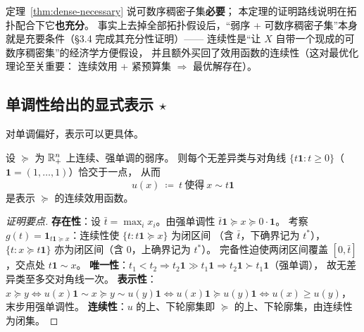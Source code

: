 \begin{remark}[与必要条件定理的关系]
定理~\ref{thm:dense-necessary} 说可数序稠密子集\textbf{必要}；
本定理的证明路线说明在拓扑配合下它\textbf{也充分}。
事实上去掉全部拓扑假设后，“弱序 + 可数序稠密子集”本身就是充要条件（§3.4 完成其充分性证明）——
连续性是“让 $X$ 自带一个现成的可数序稠密集”的经济学方便假设，
并且额外买回了效用函数的连续性（这对最优化理论至关重要：
连续效用 + 紧预算集 $\Rightarrow$ 最优解存在）。
\end{remark}

\subsection{单调性给出的显式表示 \texorpdfstring{$\star$}{*}}

对单调偏好，表示可以更具体。

\begin{proposition}[单调连续偏好的对角线构造]\label{prop:diagonal}
设 $\succeq$ 为 $\mathbb{R}^n_+$ 上连续、强单调的弱序。
则每个无差异类与对角线 $\{t\mathbf{1}:t\ge0\}$（$\mathbf{1}=(1,\dots,1)$）恰交于一点，
从而
\[
u(x)\ \coloneqq\ t\ \text{使得}\ x\sim t\mathbf{1}
\]
是表示 $\succeq$ 的连续效用函数。
\end{proposition}

\begin{proof}[证明要点]
\textbf{存在性}：设 $\bar t=\max_i x_i$。由强单调性 $\bar t\mathbf{1}\succeq x\succeq 0\cdot\mathbf{1}$。
考察 $g(t)=\mathbf{1}_{t\mathbf{1}\succeq x}$：连续性使 $\{t:t\mathbf{1}\succeq x\}$ 为闭区间
（含 $\bar t$，下确界记为 $t^*$），$\{t:x\succeq t\mathbf{1}\}$ 亦为闭区间（含 $0$，上确界记为 $t^{*}$）。
完备性迫使两闭区间覆盖 $[0,\bar t]$，交点处 $t\mathbf{1}\sim x$。
\textbf{唯一性}：$t_1<t_2\Rightarrow t_2\mathbf{1}\gg t_1\mathbf{1}\Rightarrow t_2\mathbf{1}\succ t_1\mathbf{1}$（强单调），
故无差异类至多交对角线一次。
\textbf{表示性}：$x\succeq y\iff u(x)\mathbf{1}\sim x\succeq y\sim u(y)\mathbf{1}\iff u(x)\mathbf{1}\succeq u(y)\mathbf{1}\iff u(x)\ge u(y)$，
末步用强单调性。
\textbf{连续性}：$u$ 的上、下轮廓集即 $\succeq$ 的上、下轮廓集，由连续性为闭集。
\end{proof}

